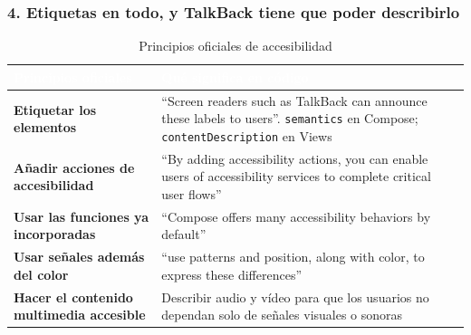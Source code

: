 \documentclass[11pt,a4paper]{article}
\newcommand{\code}[1]{\texttt{\color{primary}#1}}
\begin{document}
	\subsubsection*{4. Etiquetas en todo, y TalkBack tiene que poder describirlo}
	
	\begin{table}[htbp]
		\centering
		\small
		\begin{tabularx}{\textwidth}{@{}>{\RaggedRight\arraybackslash}p{5cm} >{\RaggedRight\arraybackslash}X@{}}
			\toprule
			\rowcolor{primary}
			\textcolor{white}{\sffamily\bfseries Principios oficiales} & \textcolor{white}{\sffamily\bfseries Qué significa en código} \\
			\midrule
			\textbf{Etiquetar los elementos} & \enquote{Screen readers such as TalkBack can announce these labels to users}. \code{semantics} en Compose; \code{contentDescription} en Views \\
			\rowcolor{soft}
			\textbf{Añadir acciones de accesibilidad} & \enquote{By adding accessibility actions, you can enable users of accessibility services to complete critical user flows} \\
			\textbf{Usar las funciones ya incorporadas} & \enquote{Compose offers many accessibility behaviors by default} \\
			\rowcolor{soft}
			\textbf{Usar señales además del color} & \enquote{use patterns and position, along with color, to express these differences} \\
			\textbf{Hacer el contenido multimedia accesible} & Describir audio y vídeo para que los usuarios no dependan solo de señales visuales o sonoras \\
			\bottomrule
		\end{tabularx}
		\caption{Principios oficiales de accesibilidad}
	\end{table}
	
\end{document}
